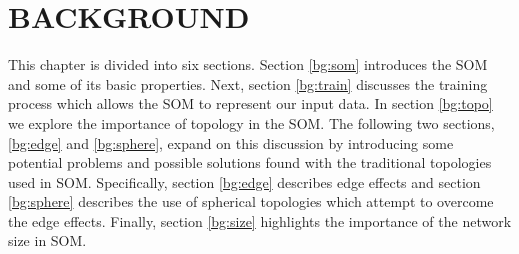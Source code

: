 \chapter{BACKGROUND}
This chapter is divided into six sections.  Section \ref{bg:som} introduces
the SOM and some of its basic properties.  Next, section \ref{bg:train}
discusses the training process which allows the SOM to represent our input
data.  In section \ref{bg:topo} we explore the importance of topology in the
SOM.  The following two sections, \ref{bg:edge} and \ref{bg:sphere}, expand on
this discussion by introducing some potential problems and possible solutions
found with the traditional topologies used in SOM. Specifically, section
\ref{bg:edge} describes edge effects and section \ref{bg:sphere} describes the
use of spherical topologies which attempt to overcome the edge effects.
Finally, section \ref{bg:size} highlights the importance of the network size
in SOM.





